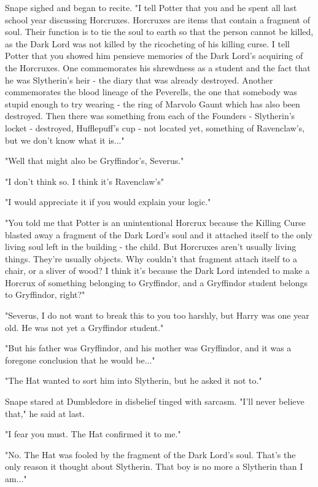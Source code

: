 \documentclass[a4paper,11pt]{article}
\begin{document}
Snape sighed and began to recite. "I tell Potter that you and he spent all last school year discussing Horcruxes. Horcruxes are items that contain a fragment of soul. Their function is to tie the soul to earth so that the person cannot be killed, as the Dark Lord was not killed by the ricocheting of his killing curse. I tell Potter that you showed him pensieve memories of the Dark Lord's acquiring of the Horcruxes. One commemorates his shrewdness as a student and the fact that he was Slytherin's heir - the diary that was already destroyed. Another commemorates the blood lineage of the Peverells, the one that somebody was stupid enough to try wearing - the ring of Marvolo Gaunt which has also been destroyed. Then there was something from each of the Founders - Slytherin's locket - destroyed, Hufflepuff's cup - not located yet, something of Ravenclaw's, but we don't know what it is..."

"Well that might also be Gryffindor's, Severus."

"I don't think so. I think it's Ravenclaw's"

"I would appreciate it if you would explain your logic."

"You told me that Potter is an unintentional Horcrux because the Killing Curse blasted away a fragment of the Dark Lord's soul and it attached itself to the only living soul left in the building - the child. But Horcruxes aren't usually living things. They're usually objects. Why couldn't that fragment attach itself to a chair, or a sliver of wood? I think it's because the Dark Lord intended to make a Horcrux of something belonging to Gryffindor, and a Gryffindor student belongs to Gryffindor, right?"

"Severus, I do not want to break this to you too harshly, but Harry was one year old. He was not yet a Gryffindor student."

"But his father was Gryffindor, and his mother was Gryffindor, and it was a foregone conclusion that he would be..."

"The Hat wanted to sort him into Slytherin, but he asked it not to."

Snape stared at Dumbledore in disbelief tinged with sarcasm. "I'll never believe that," he said at last.

"I fear you must. The Hat confirmed it to me."

"No. The Hat was fooled by the fragment of the Dark Lord's soul. That's the only reason it thought about Slytherin. That boy is no more a Slytherin than I am..."
\end{document}
